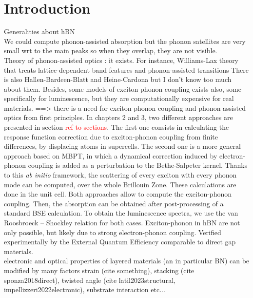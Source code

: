 \chapter*{Introduction}
Generalities about hBN \\
We could compute phonon-assisted absorption but the phonon satellites are very small wrt to the main peaks so when they overlap, they are not visible.\\
Theory of phonon-assisted optics : it exists. For instance, Williams-Lax theory that treats lattice-dependent band features and phonon-assisted transitions 
There is also Hallen-Bardeen-Blatt and Heine-Cardona but I don't know too much about them.
Besides, some models of exciton-phonon coupling exists also, some specifically for luminescence, but they are computationally expensive for real materials.
==> there is a need for exciton-phonon coupling and phonon-assisted optics from first principles. In chapters 2 and 3, two different approaches are presented in section \textcolor{red}{ref to sections}. The first one consists in calculating the response function correction due to exciton-phonon coupling from finite differences, by displacing atoms in supercells. The second one is a more general approach based on \acrshort{MBPT}, in which a dynamical correction induced by electron-phonon coupling is added as a perturbation to the Bethe-Salpeter kernel. Thanks to this \textit{ab initio} framework, the scattering of every exciton with every phonon mode can be computed, over the whole Brillouin Zone. These calculations are done in the unit cell.
Both approaches allow to compute the exciton-phonon coupling. Then, the absorption can be obtained after post-processing of a standard \acrshort{BSE} calculation. To obtain the luminescence spectra, we use the van Roosbroeck -- Shockley relation for both cases.
Exciton-phonon in hBN are not only possible, but likely due to strong electron-phonon coupling. Verified experimentally by the External Quantum Efficiency comparable to direct gap materials.\\

%
electronic and optical properties of layered materials (an in particular BN) can be modified by many factors
strain (cite something), stacking (cite sponza2018direct), twisted angle (cite latil2023structural, impellizzeri2022electronic), substrate interaction etc...\\

%
%
